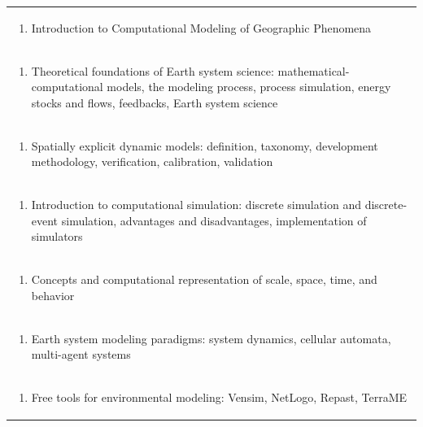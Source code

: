 \documentclass[11pt]{article}
\begin{document}
\begin{center}
\begin{longtable}{|p{4cm}|p{4cm}|p{4cm}|p{4cm}|}
\multicolumn{4}{|p{\dimexpr 16cm + 6\tabcolsep\relax}|}{\begin{enumerate}[start=1]\item Introduction to Computational Modeling of Geographic Phenomena\end{enumerate}}\\
\multicolumn{4}{|p{\dimexpr 16cm + 6\tabcolsep\relax}|}{\begin{enumerate}[start=2]\item Theoretical foundations of Earth system science: mathematical-computational models, the modeling process, process simulation, energy stocks and flows, feedbacks, Earth system science\end{enumerate}}\\
\multicolumn{4}{|p{\dimexpr 16cm + 6\tabcolsep\relax}|}{\begin{enumerate}[start=3]\item Spatially explicit dynamic models: definition, taxonomy, development methodology, verification, calibration, validation\end{enumerate}}\\
\multicolumn{4}{|p{\dimexpr 16cm + 6\tabcolsep\relax}|}{\begin{enumerate}[start=4]\item Introduction to computational simulation: discrete simulation and discrete-event simulation, advantages and disadvantages, implementation of simulators\end{enumerate}}\\
\multicolumn{4}{|p{\dimexpr 16cm + 6\tabcolsep\relax}|}{\begin{enumerate}[start=5]\item Concepts and computational representation of scale, space, time, and behavior\end{enumerate}}\\
\multicolumn{4}{|p{\dimexpr 16cm + 6\tabcolsep\relax}|}{\begin{enumerate}[start=6]\item Earth system modeling paradigms: system dynamics, cellular automata, multi-agent systems\end{enumerate}}\\
\multicolumn{4}{|p{\dimexpr 16cm + 6\tabcolsep\relax}|}{\begin{enumerate}[start=7]\item Free tools for environmental modeling: Vensim, NetLogo, Repast, TerraME\end{enumerate}}\\

\end{longtable}
\end{center}
\end{document}
